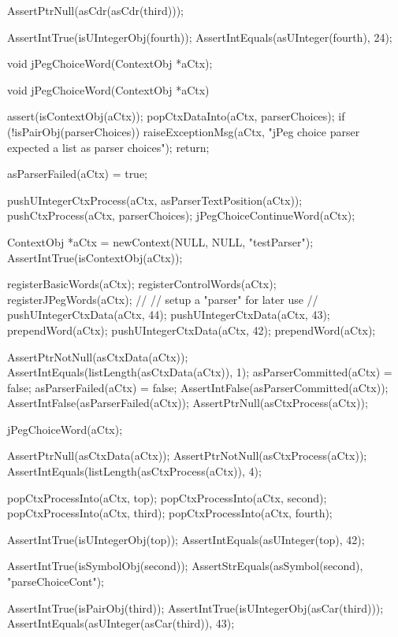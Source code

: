   AssertPtrNull(asCdr(asCdr(third)));
  
  AssertIntTrue(isUIntegerObj(fourth));
  AssertIntEquals(asUInteger(fourth), 24);
\stopCTest
\stopTestCase
\stopTestSuite

\startTestSuite[jPegChoiceWord]

\startCHeader
void jPegChoiceWord(ContextObj *aCtx);
\stopCHeader

\startCCode
void jPegChoiceWord(ContextObj *aCtx) {
  assert(isContextObj(aCtx));
  popCtxDataInto(aCtx, parserChoices);
  if (!isPairObj(parserChoices)) {
    raiseExceptionMsg(aCtx,
      "jPeg choice parser expected a list as parser choices");
    return;
  }
  
  asParserFailed(aCtx) = true;
  
  pushUIntegerCtxProcess(aCtx, asParserTextPosition(aCtx));
  pushCtxProcess(aCtx, parserChoices);
  jPegChoiceContinueWord(aCtx);
}
\stopCCode

\startCTest
  ContextObj *aCtx = newContext(NULL, NULL, "testParser");
  AssertIntTrue(isContextObj(aCtx));
  
  registerBasicWords(aCtx);
  registerControlWords(aCtx);
  registerJPegWords(aCtx);
  //
  // setup a "parser" for later use
  //
  pushUIntegerCtxData(aCtx, 44);
  pushUIntegerCtxData(aCtx, 43);
  prependWord(aCtx);
  pushUIntegerCtxData(aCtx, 42);
  prependWord(aCtx);
  
  AssertPtrNotNull(asCtxData(aCtx));
  AssertIntEquals(listLength(asCtxData(aCtx)), 1);
  asParserCommitted(aCtx) = false;
  asParserFailed(aCtx)    = false;
  AssertIntFalse(asParserCommitted(aCtx));
  AssertIntFalse(asParserFailed(aCtx));
  AssertPtrNull(asCtxProcess(aCtx));
  
  jPegChoiceWord(aCtx);
  
  AssertPtrNull(asCtxData(aCtx));
  AssertPtrNotNull(asCtxProcess(aCtx));
  AssertIntEquals(listLength(asCtxProcess(aCtx)), 4);
  
  popCtxProcessInto(aCtx, top);
  popCtxProcessInto(aCtx, second);
  popCtxProcessInto(aCtx, third);
  popCtxProcessInto(aCtx, fourth);
  
  AssertIntTrue(isUIntegerObj(top));
  AssertIntEquals(asUInteger(top), 42);    

  AssertIntTrue(isSymbolObj(second));
  AssertStrEquals(asSymbol(second), "parseChoiceCont");
  
  AssertIntTrue(isPairObj(third));
  AssertIntTrue(isUIntegerObj(asCar(third)));
  AssertIntEquals(asUInteger(asCar(third)), 43);
  
